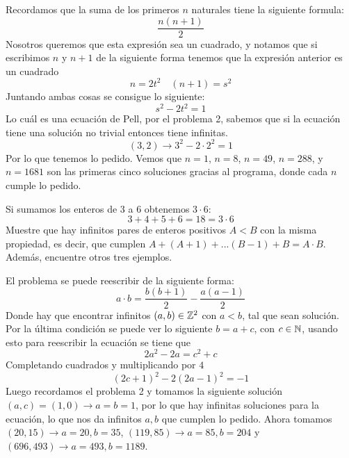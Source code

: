 \begin{sol}
	Recordamos que la suma de los primeros $n$ naturales tiene la siguiente formula:
	\[
		\frac{n(n+1)}2
	\]
	Nosotros queremos que esta expresión sea un cuadrado, y notamos que si escribimos $n$ y $n+1$ de la siguiente forma tenemos que la expresión anterior es un cuadrado
	\[
		n=2t^2\quad(n+1)=s^2
	\]
	Juntando ambas cosas se consigue lo siguiente:
	\[
		s^2-2t^2=1
	\]
	Lo cuál es una ecuación de Pell, por el problema 2, sabemos que si la ecuación tiene una solución no trivial entonces tiene infinitas.
	\[
		(3,2)\rightarrow 3^2-2\cdot2^2=1
	\]
	Por lo que tenemos lo pedido. Vemos que $n=1$, $n=8$, $n=49$, $n=288$, y $n=1681$ son las primeras cinco soluciones gracias al programa\cite{prog}, donde cada $n$ cumple lo pedido.
\end{sol}

\begin{prob}[3 pts]
	Si sumamos los enteros de $3$ a $6$ obtenemos $3\cdot 6$:
	\[3+4+5+6=18=3\cdot 6\]
	Muestre que hay infinitos pares de enteros positivos $A<B$ con la misma propiedad, es decir, que cumplen $A+(A+1)+...(B-1)+B=A\cdot B$. Además, encuentre otros tres ejemplos.
\end{prob}

\begin{sol}
	El problema se puede reescribir de la siguiente forma:
	\[
		a\cdot b=\frac{b(b+1)}2-\frac{a(a-1)}2
	\]
	Donde hay que encontrar infinitos $(a,b)\in\mathbb{Z}^2$ con $a<b$, tal que sean solución. Por la última condición se puede ver lo siguiente $b=a+c$, con $c\in\mathbb{N}$, usando esto para reescribir la ecuación se tiene que
	\[
		2a^2-2a=c^2+c
	\]
	Completando cuadrados y multiplicando por $4$
	\[
		(2c+1)^2-2(2a-1)^2=-1
	\]
	Luego recordamos el problema 2 y tomamos la siguiente solución $(a,c)=(1,0)\rightarrow a=b=1$, por lo que hay infinitas soluciones para la ecuación, lo que nos da infinitos $a,b$ que cumplen lo pedido. Ahora tomamos $(20,15)\rightarrow a=20, b=35$, $(119,85)\rightarrow a=85, b=204$ y $(696,493)\rightarrow a=493, b=1189$.
\end{sol}




